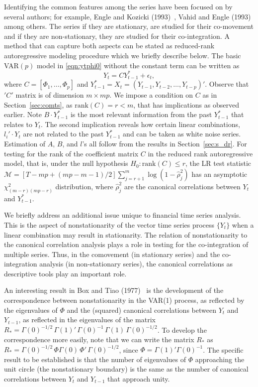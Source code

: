 Identifying the common features among the series have been focused on by several authors; for example, Engle and Kozicki (1993)~\cite{koz93}, Vahid and Engle (1993)~\cite{vah93} among others. The series if they are stationary, are studied for their co-movement and if they are non-stationary, they are studied for their co-integration. A method that can capture both aspects can be stated as reduced-rank autoregressive modeling procedure which we briefly describe below. The basic VAR$(p)$ model in \eqref{eqn:ytphi0} without the constant term can be written as
	\begin{equation} \label{eqn:2ytcyt}
	Y_t = CY_{t-1}^*+\epsilon_t,
	\end{equation}
where $C=[\Phi_1, \ldots, \Phi_p]$ and $Y_{t-1}^*= X_t= (Y_{t-1}, Y_{t-2}, \ldots, Y_{t-p})'$. Observe that $'C'$ matrix is of dimension $m \times mp$. We impose a condition on $C$ as in Section~\ref{sec:comts}, as $\text{rank}(C)= r < m$, that has implications as observed earlier. Note $B \cdot Y_{t-1}^*$ is the most relevant information from the past $Y_{t-1}^*$ that relates to $Y_t$. The second implication reveals how certain linear combinations, $l_i' \cdot Y_t$ are not related to the past $Y_{t-1}^*$ and can be taken as white noise series. Estimation of $A$, $B$, and $l$'s all follow from the results in Section~\ref{sec:s_dr}. For testing for the rank of the coefficient matrix $C$ in the reduced rank autoregressive  model, that is, under the null hypothesis $H_0: \text{rank}(C) \leq r$, the LR test statistic ${\mathcal{M}} = [T - mp + (mp - m - 1)/2] \sum_{j= r + 1}^{m} \log(1 - \hat{\rho}_{j}^{2} )$ has an asymptotic $\chi_{(m-r)(mp-r)}^{2}$ distribution, where $\hat{\rho}_j^2$ are the canonical correlations between $Y_t$ and $Y_{t-1}^*$. \twomedskip


We briefly address an additional issue unique to financial time series analysis.  This is the aspect of nonstationarity of the vector time series process $\{Y_t\}$ when a linear combination may result in stationarity. The relation of nonstationarity to the canonical correlation analysis plays a role in testing for the co-integration of multiple series. Thus, in the comovement (in stationary series) and the co-integration analysis (in non-stationary series), the canonical correlations as descriptive tools play an important role.


An interesting result in Box and Tiao (1977)~\cite{box77} is the development of the correspondence between nonstationarity in the VAR(1) process, as reflected by the eigenvalues of $\Phi$ and the (squared) canonical correlations between $Y_t$ and $Y_{t-1}$, as reflected in the eigenvalues of the matrix $R_* = \Gamma(0)^{-1/2}\, \Gamma(1)' \, \Gamma(0)^{-1}\, \Gamma(1)\, \Gamma(0)^{-1/2}$. To develop the correspondence more easily, note that we can write the matrix $R_*$ as $R_* = \Gamma (0)^{-1/2}\, \Phi \Gamma(0)\, \Phi' \, \Gamma(0)^{-1/2}$, since $\Phi = \Gamma(1)' \Gamma(0)^{-1}$. The specific result to be established is that the number of eigenvalues of $\Phi$ approaching the unit circle (the nonstationary boundary) is the same as the number of canonical correlations between $Y_t$ and $Y_{t-1}$ that approach unity.  


